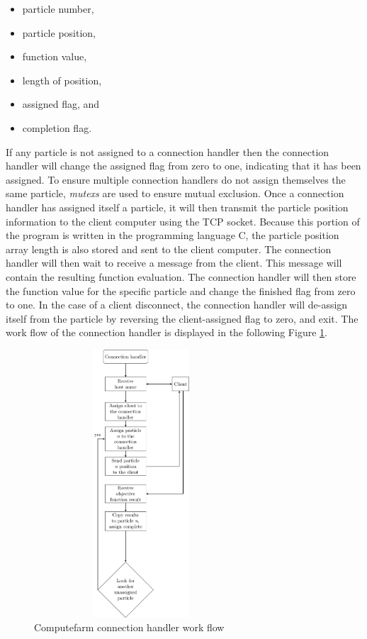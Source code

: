 \begin{itemize}
    \item particle number,
    \item particle position,
    \item function value,
    \item length of position, 
    \item assigned flag, and
    \item completion flag.
\end{itemize}
If any particle is not assigned to a connection handler then the connection handler will change the assigned flag from zero to one, indicating that it has been assigned. To ensure multiple connection handlers do not assign themselves the same particle, \textit{mutexs} are used to ensure mutual exclusion. Once a connection handler has assigned itself a particle, it will then transmit the particle position information to the client computer using the TCP socket. Because this portion of the program is written in the programming language C, the particle position array length is also stored and sent to the client computer. The connection handler will then wait to receive a message from the client. This message will contain the resulting function evaluation. The connection handler will then store the function value for the specific particle and change the finished flag from zero to one. In the case of a client disconnect, the connection handler will de-assign itself from the particle by reversing the client-assigned flag to zero, and exit. The work flow of the connection handler is displayed in the following Figure \ref{fig:connection handler}.

\begin{figure}[h!]
    \centering
    \includegraphics[width=8cm,height=10cm]{chapters/chapter_3_Software/connection_handler.pdf}
    \caption{Computefarm connection handler work flow}
    \label{fig:connection handler}
\end{figure}


